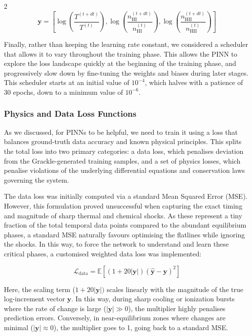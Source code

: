 \documentclass[10pt,a4paper]{article}
\begin{document}
\begin{multicols}{2}
\begin{equation*}
\mathbf{y}=\left[\log\left(\frac{T^{(t+dt)}}{T^{(t)}}\right), \log\left(\frac{n_{\mathrm{HI}}^{(t+dt)}}{n_{\mathrm{HI}}^{(t)}}\right), \log\left(\frac{n_{\mathrm{HII}}^{(t+dt)}}{n_{\mathrm{HII}}^{(t)}}\right)\right]
\end{equation*}

Finally, rather than keeping the learning rate constant, we considered a scheduler that allows it to vary throughout the training phase. This allows the PINN to explore the loss landscape quickly at the beginning of the training phase, and progressively slow down by fine-tuning the weights and biases during later stages. This scheduler starts at an initial value of $10^{-4}$, which halves with a patience of 30 epochs, down to a minimum value of $10^{-6}$.


\subsubsection{Physics and Data Loss Functions}

As we discussed, for PINNs to be helpful, we need to train it using a loss that balances ground-truth data accuracy and known physical principles. This splits the total loss into two primary categories: a data loss, which penalises deviation from the Grackle-generated training samples, and a set of physics losses, which penalise violations of the underlying differential equations and conservation laws governing the system.

The data loss was initially computed via a standard Mean Squared Error (MSE). However, this formulation proved unsuccessful when capturing the exact timing and magnitude of sharp thermal and chemical shocks. As these represent a tiny fraction of the total temporal data points compared to the abundant equilibrium phases, a standard MSE naturally favours optimising the flatlines while ignoring the shocks. In this way, to force the network to understand and learn these critical phases, a customised weighted data loss was implemented:

\begin{equation*}
\mathcal{L}_{\text{data}} = \mathbb{E}\left[(1 + \text{20}|\mathbf{y}|)(\hat{\mathbf{y}} - \mathbf{y})^2\right]
\end{equation*}

Here, the scaling term ($1+20|\mathbf{y}|)$ scales linearly with the magnitude of the true log-increment vector $\mathbf{y}$. In this way, during sharp cooling or ionization bursts where the rate of change is large ($|\mathbf{y}| \gg 0$), the multiplier highly penalises prediction errors. Conversely, in near-equilibrium zones where changes are minimal ($|\mathbf{y}| \approx 0$), the multiplier goes to 1, going back to a standard MSE.


\end{multicols}
\end{document}
